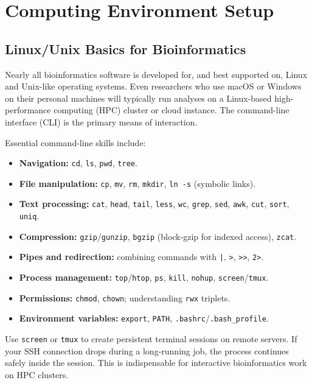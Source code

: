 \section{Computing Environment Setup}
\label{sec:bioinf:computing}

\subsection{Linux/Unix Basics for Bioinformatics}
\label{subsec:bioinf:linux}

Nearly all bioinformatics software is developed for, and best supported on, Linux and Unix-like operating systems. Even researchers who use macOS or Windows on their personal machines will typically run analyses on a Linux-based high-performance computing (HPC) cluster or cloud instance. The command-line interface (CLI) is the primary means of interaction.

Essential command-line skills include:

\begin{itemize}[itemsep=2pt]
  \item \textbf{Navigation:} \texttt{cd}, \texttt{ls}, \texttt{pwd}, \texttt{tree}.
  \item \textbf{File manipulation:} \texttt{cp}, \texttt{mv}, \texttt{rm}, \texttt{mkdir}, \texttt{ln -s} (symbolic links).
  \item \textbf{Text processing:} \texttt{cat}, \texttt{head}, \texttt{tail}, \texttt{less}, \texttt{wc}, \texttt{grep}, \texttt{sed}, \texttt{awk}, \texttt{cut}, \texttt{sort}, \texttt{uniq}.
  \item \textbf{Compression:} \texttt{gzip}/\texttt{gunzip}, \texttt{bgzip} (block-gzip for indexed access), \texttt{zcat}.
  \item \textbf{Pipes and redirection:} combining commands with \texttt{|}, \texttt{>}, \texttt{>>}, \texttt{2>}.
  \item \textbf{Process management:} \texttt{top}/\texttt{htop}, \texttt{ps}, \texttt{kill}, \texttt{nohup}, \texttt{screen}/\texttt{tmux}.
  \item \textbf{Permissions:} \texttt{chmod}, \texttt{chown}; understanding \texttt{rwx} triplets.
  \item \textbf{Environment variables:} \texttt{export}, \texttt{PATH}, \texttt{.bashrc}/\texttt{.bash\_profile}.
\end{itemize}

\begin{tipbox}[title={Screen and Tmux}]
Use \texttt{screen} or \texttt{tmux} to create persistent terminal sessions on remote servers. If your SSH connection drops during a long-running job, the process continues safely inside the session. This is indispensable for interactive bioinformatics work on HPC clusters.
\end{tipbox}

